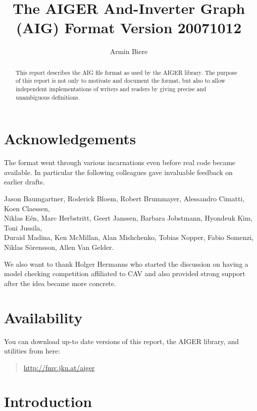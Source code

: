 \documentclass[10pt]{llncs}
\title{The AIGER And-Inverter Graph (AIG) Format Version 20071012}
\author{Armin Biere}
\institute{Johannes Kepler University Linz, Austria}
\begin{document}
\maketitle
\thispagestyle{fancy}

\begin{abstract}
  This report describes the AIG file format as used by the AIGER library.
  The purpose of this report is not only to motivate and document the
  format, but also to allow independent implementations of writers and
  readers by giving precise and unambiguous definitions.
\end{abstract}

\section{Acknowledgements}

  The format went through various incarnations even before real code became
  available.  In particular the following colleagues gave invaluable
  feedback on earlier drafts.
\begin{center}
\begin{minipage}{.87\linewidth}
      Jason Baumgartner, Roderick Bloem, Robert Brummayer, Alessandro
      Cimatti, Koen Claessen, \\ Niklas E\'en, Marc Herbstritt, Geert Janssen,
      Barbara Jobstmann, Hyondeuk Kim, Toni Jussila, \\ Duraid Madina,
      Ken McMillan, Alan Mishchenko, Tobias Nopper, Fabio Somenzi, 
      \\ Niklas S\"orensson, Allen Van Gelder.
\end{minipage}
\end{center}
  We also want to thank Holger Hermanns who started the discussion on having
  a model checking competition affiliated to CAV and also provided strong
  support after the idea became more concrete.

\section{Availability}
  
  You can download up-to date versions of this report, the AIGER library,
  and utilities from here:
  \begin{quote}
  \url{http://fmv.jku.at/aiger}
  \end{quote}

\section{Introduction}
\end{document}
